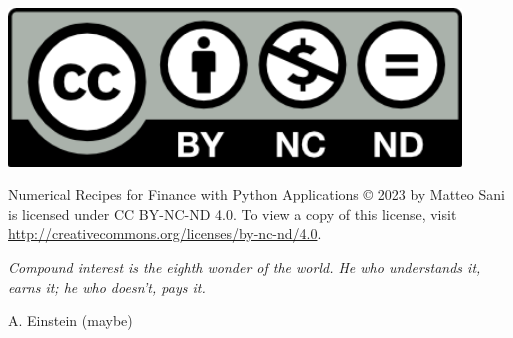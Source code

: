 \thispagestyle{empty}
\vspace*{\fill}
\begin{minipage}{0.25\textwidth}
\includegraphics[width=0.9\textwidth]{figures/by-nc-nd}
\end{minipage}
\begin{minipage}{0.75\textwidth}
Numerical Recipes for Finance with Python Applications © 2023 by Matteo Sani is licensed under CC BY-NC-ND 4.0. To view a copy of this license, visit \href{http://creativecommons.org/licenses/by-nc-nd/4.0}{http://creativecommons.org/licenses/by-nc-nd/4.0}.
\end{minipage}
\clearpage
\thispagestyle{empty}
\null
\vspace{4cm}
\epigraph{\itshape\myopeningquote
	Compound interest is the eighth wonder of the world. He who understands it, earns it; he who doesn't, pays it.\myclosingquote}
{A. Einstein (maybe)}
\clearpage
\thispagestyle{empty}
\null
\thispagestyle{empty}
